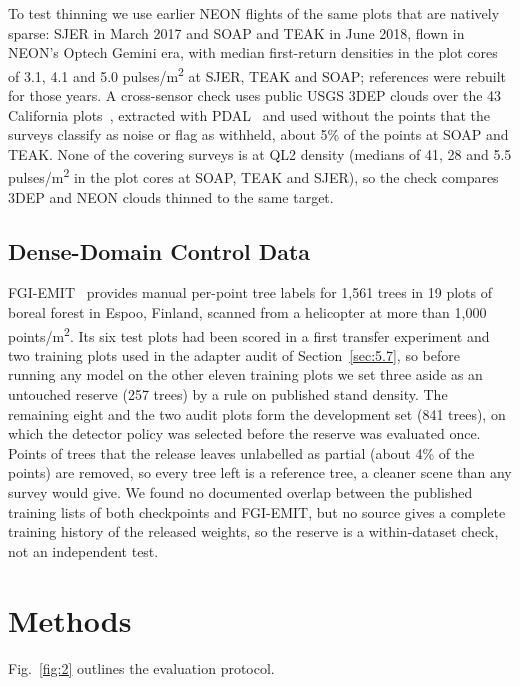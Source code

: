\documentclass[journal]{IEEEtran}
\begin{document}
To test thinning we use earlier NEON flights of the same plots that are natively
sparse: SJER in March 2017 and SOAP and TEAK in June 2018, flown in NEON's
Optech Gemini era, with median first-return densities in the plot cores of 3.1,
4.1 and 5.0 pulses/m\textsuperscript{2} at SJER, TEAK and SOAP; references were rebuilt for those
years. A cross-sensor check uses public USGS 3DEP clouds over the 43 California
plots~\cite{usgs2026usgs}, extracted with PDAL~\cite{butler2021pdal} and used without
the points that the surveys classify as noise or flag as withheld, about 5\% of
the points at SOAP and TEAK. None of the covering surveys is at QL2 density
(medians of 41, 28 and 5.5 pulses/m\textsuperscript{2} in the plot cores at SOAP, TEAK and SJER),
so the check compares 3DEP and NEON clouds thinned to the same target.

\subsection{Dense-Domain Control Data}\label{sec:3.5}

FGI-EMIT~\cite{ruoppa2026benchmarking,ruoppa2026fgiemit} provides manual per-point
tree labels for 1,561 trees in 19 plots of boreal forest in Espoo, Finland,
scanned from a helicopter at more than 1,000 points/m\textsuperscript{2}. Its six test plots had
been scored in a first transfer experiment and two training plots used in the
adapter audit of Section~\ref{sec:5.7}, so before running any model on the other eleven
training plots we set three aside as an untouched reserve (257 trees) by a rule
on published stand density. The remaining eight and the two audit plots form the
development set (841 trees), on which the detector policy was selected before
the reserve was evaluated once. Points of trees that the release leaves
unlabelled as partial (about 4\% of the points) are removed, so every tree left
is a reference tree, a cleaner scene than any survey would give. We found no
documented overlap between the published training lists of both checkpoints and
FGI-EMIT, but no source gives a complete training history of the released
weights, so the reserve is a within-dataset check, not an independent test.

\section{Methods}\label{sec:4}

Fig.~\ref{fig:2} outlines the evaluation protocol.
\end{document}
